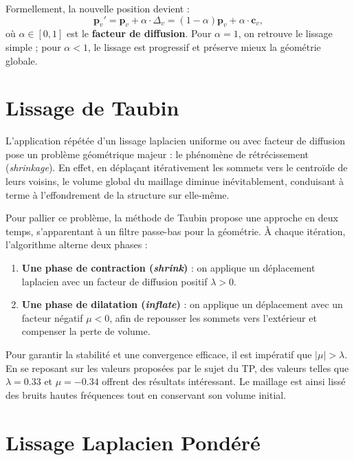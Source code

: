 \documentclass[11pt,a4paper]{article}
\begin{document}
Formellement, la nouvelle position devient :
\begin{equation}
\mathbf{p}_v' = \mathbf{p}_v + \alpha \cdot \Delta_v = (1 - \alpha) \mathbf{p}_v + \alpha \cdot \mathbf{c}_v,
\end{equation}
où $\alpha \in [0,1]$ est le \textbf{facteur de diffusion}. Pour $\alpha=1$, on retrouve le lissage simple ; pour $\alpha<1$, le lissage est progressif et préserve mieux la géométrie globale.

\newpage
\newpage

\section{Lissage de Taubin}
L'application répétée d'un lissage laplacien uniforme ou avec facteur de diffusion pose un problème géométrique majeur : le phénomène de rétrécissement (\textit{shrinkage}). En effet, en déplaçant itérativement les sommets vers le centroïde de leurs voisins, le volume global du maillage diminue inévitablement, conduisant à terme à l'effondrement de la structure sur elle-même.

Pour pallier ce problème, la méthode de Taubin propose une approche en deux temps, s'apparentant à un filtre passe-bas pour la géométrie. À chaque itération, l'algorithme alterne deux phases :
\begin{enumerate}
    \item \textbf{Une phase de contraction (\textit{shrink})} : on applique un déplacement laplacien avec un facteur de diffusion positif $\lambda > 0$.
    \item \textbf{Une phase de dilatation (\textit{inflate})} : on applique un déplacement avec un facteur négatif $\mu < 0$, afin de repousser les sommets vers l'extérieur et compenser la perte de volume.
\end{enumerate}

Pour garantir la stabilité et une convergence efficace, il est impératif que $|\mu| > \lambda$. En se reposant sur les valeurs proposées par le sujet du TP, des valeurs telles que $\lambda = 0.33$ et $\mu = -0.34$ offrent des résultats intéressant. Le maillage est ainsi lissé des bruits hautes fréquences tout en conservant son volume initial.

\newpage

\section{Lissage Laplacien Pondéré}
\end{document}
